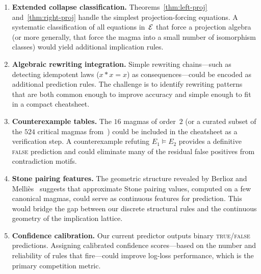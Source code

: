 \begin{enumerate}[label=(\roman*)]
\item \textbf{Extended collapse classification.}  Theorems~\ref{thm:left-proj}
  and~\ref{thm:right-proj} handle the simplest projection-forcing
  equations.  A systematic classification of all equations in~$\mathcal{E}$
  that force a projection algebra (or more generally, that force the
  magma into a small number of isomorphism classes) would yield
  additional implication rules.

\item \textbf{Algebraic rewriting integration.}  Simple rewriting
  chains---such as detecting idempotent laws ($x * x = x$) as
  consequences---could be encoded as additional prediction rules.
  The challenge is to identify rewriting patterns that are both
  common enough to improve accuracy and simple enough to fit in a
  compact cheatsheet.

\item \textbf{Counterexample tables.}  The $16$ magmas of order~$2$
  (or a curated subset of the $524$ critical magmas
  from~\cite{bolan2025equational}) could be included in the cheatsheet
  as a verification step.  A counterexample refuting $E_1 \models E_2$
  provides a definitive \textsc{false} prediction and could eliminate
  many of the residual false positives from contradiction motifs.

\item \textbf{Stone pairing features.}  The geometric structure
  revealed by Berlioz and Melli\`es~\cite{berlioz2026latent} suggests
  that approximate Stone pairing values, computed on a few canonical
  magmas, could serve as continuous features for prediction.  This
  would bridge the gap between our discrete structural rules and the
  continuous geometry of the implication lattice.

\item \textbf{Confidence calibration.}  Our current predictor outputs
  binary \textsc{true}/\textsc{false} predictions.  Assigning
  calibrated confidence scores---based on the number and reliability
  of rules that fire---could improve log-loss performance, which is
  the primary competition metric.
\end{enumerate}
